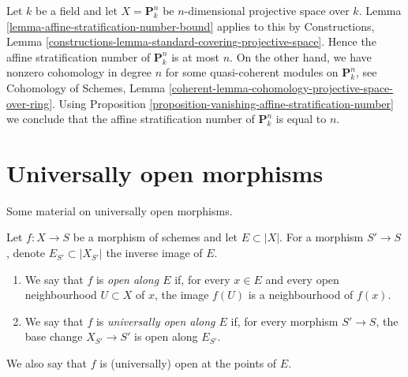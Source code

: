 \begin{example}
\label{example-affine-stratification-number}
Let $k$ be a field and let $X = \mathbf{P}^n_k$ be $n$-dimensional projective
space over $k$. Lemma \ref{lemma-affine-stratification-number-bound}
applies to this by Constructions, Lemma
\ref{constructions-lemma-standard-covering-projective-space}.
Hence the affine stratification number of $\mathbf{P}^n_k$ is
at most $n$. On the other hand, we have nonzero cohomology
in degree $n$ for some quasi-coherent modules on
$\mathbf{P}^n_k$, see
Cohomology of Schemes, Lemma
\ref{coherent-lemma-cohomology-projective-space-over-ring}.
Using Proposition \ref{proposition-vanishing-affine-stratification-number}
we conclude that the affine stratification number of
$\mathbf{P}^n_k$ is equal to $n$.
\end{example}








\section{Universally open morphisms}
\label{section-universally-open}

\noindent
Some material on universally open morphisms.

\begin{definition}
\label{definition-universally-open-along}
Let $f : X \to S$ be a morphism of schemes and let $E \subset |X|$.
For a morphism $S' \to S$, denote $E_{S'} \subset |X_{S'}|$ the inverse
image of $E$.
\begin{enumerate}
\item We say that $f$ is \textit{open along $E$} if, for every $x \in E$
and every open neighbourhood $U \subset X$ of $x$, the image $f(U)$ is a
neighbourhood of $f(x)$.
\item We say that $f$ is \textit{universally open along $E$} if, for every
morphism $S' \to S$, the base change $X_{S'} \to S'$ is open along
$E_{S'}$.
\end{enumerate}
We also say that $f$ is (universally) open at the points of $E$.
\end{definition}

